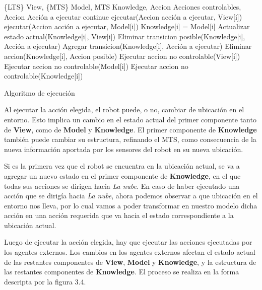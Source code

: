 \begin{algorithm}
\begin{algorithmic}
\REQUIRE \{LTS\} View, \{MTS\} Model, MTS Knowledge, {Accion} Acciones controlables, Accion Acción a ejecutar
\STATE continue
\ENDIF
\STATE ejecutar(Accion acción a ejecutar, View[i])
\STATE ejecutar(Accion acción a ejecutar, Model[i])
\STATE Knowledge[i] = Model[i]
\ENDIF
\STATE Actualizar estado actual(Knowledge[i], View[i])
\STATE Eliminar transicion posible(Knowledge[i], Acción a ejecutar)
\STATE Agregar transicion(Knowledge[i], Acción a ejecutar)
\STATE Eliminar accion(Knowledge[i], Accion posible)
\ENDIF
\ENDFOR
\ENDFOR
{}
\STATE Ejecutar accion no controlable(View[i])
\STATE Ejecutar accion no controlable(Model[i])
\STATE Ejecutar accion no controlable(Knowledge[i])
\ENDFOR
\end{algorithmic}
\caption{Algoritmo de ejecución}
\end{algorithm}

Al ejecutar la acción elegida, el robot puede, o no, cambiar de ubicación en el entorno. Esto implica un cambio en el estado actual del primer componente tanto 
de \textbf{View}, como de \textbf{Model} y \textbf{Knowledge}. El primer componente de \textbf{Knowledge} también puede cambiar su estructura, refinando el MTS, 
como consecuencia de la nueva información aportada por los sensores del robot en su nueva ubicación.

Si es la primera vez que el robot se encuentra en la ubicación actual, se va a agregar un nuevo estado en el primer componente de \textbf{Knowledge}, en el que todas 
sus acciones se dirigen hacia \textit{La nube}. En caso de haber ejecutado una acción que se dirigía hacia \textit{La nube}, ahora podemos observar a que ubicación 
en el entorno nos lleva, por lo cual vamos a poder transformar en nuestro modelo dicha acción en una acción requerida que va hacia el estado correspondiente 
a la ubicación actual.

Luego de ejecutar la acción elegida, hay que ejecutar las acciones ejecutadas por los agentes externos. Los cambios en los agentes externos afectan el estado actual 
de las restantes componentes de \textbf{View}, \textbf{Model} y \textbf{Knowledge}, y la estructura de las restantes componentes de \textbf{Knowledge}. El proceso se 
realiza en la forma descripta por la figura 3.4.

